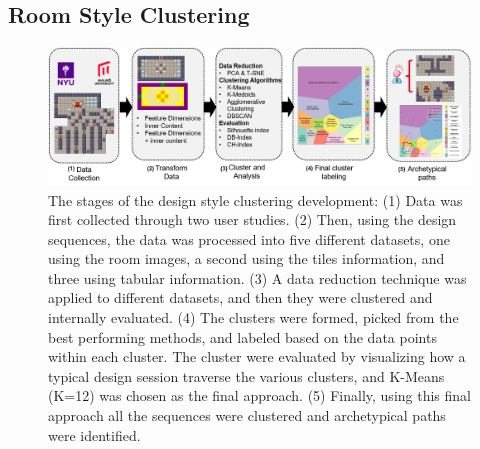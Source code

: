 \subsection{Room Style Clustering}


\begin{figure}[ht!]
\centerline{\includegraphics[width=\textwidth]{figures/process-steps.png}}
\caption{The stages of the design style clustering development: (1) Data was first collected through two user studies. (2) Then, using the design sequences, the data was processed into five different datasets, one using the room images, a second using the tiles information, and three using tabular information. (3) A data reduction technique was applied to different datasets, and then they were clustered and internally evaluated. (4) The clusters were formed, picked from the best performing methods, and labeled based on the data points within each cluster. The cluster were evaluated by visualizing how a typical design session traverse the various clusters, and K-Means (K=12) was chosen as the final approach. (5) Finally, using this final approach all the sequences were clustered and archetypical paths were identified.%
} \label{p6fig:approach-steps}
\end{figure}

